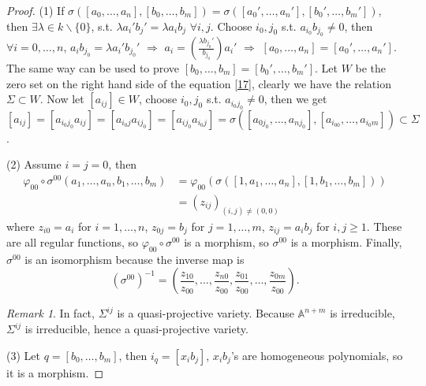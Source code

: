 \documentclass{amsart}
\theoremstyle{plain}
\theoremstyle{definition}
\theoremstyle{remark}
\newtheorem*{remark}{Remark}
\numberwithin{equation}{section}
\begin{document}
\begin{proof}
	(1) If $ \sigma( [a_0,\dots,a_n],[b_0,\dots,b_m] )=\sigma( [ {a_0}',\dots,{a_n}' ],[ {b_0}',\dots,{b_m}' ] ) $, then $ \exists \lambda\in k\backslash \{ 0 \} $, s.t. $ \lambda a_i'b_j'=\lambda a_ib_j $ $ \forall i,j $. Choose $ i_0,j_0 $ s.t. $ a_{i_0}b_{j_0}\neq 0 $, then $ \forall i=0,\dots,n $, $ a_ib_{j_0}=\lambda a_i'b_{j_0}' $ $ \Rightarrow $ $ a_i=\left(\frac{\lambda b_{j_0}'}{b_{j_0}}\right)a_i' $ $ \Rightarrow $ $ [a_0,\dots,a_n]=[{a_0}',\dots,{a_n}'] $. The same way can be used to prove $ [b_0,\dots,b_m]=[{b_0}',\dots,{b_m}'] $. Let $ W $ be the zero set on the right hand side of the equation \ref{17}, clearly we have the relation $ \Sigma\subset W $. Now let $ [a_{ij}]\in W $, choose $ i_0,j_0 $ s.t. $ a_{i_0j_0}\neq 0 $, then we get $ [a_{ij}]=[a_{i_0j_0}a_{ij}]=[a_{i_0j}a_{ij_0}]=[a_{ij_0}a_{i_0j}]=\sigma([a_{0j_0},\dots,a_{nj_0}],[a_{i_00},\dots,a_{i_0m}])\subset \Sigma $.
	
	(2) Assume $ i=j=0 $, then
	$$\begin{array}{cc}
	\varphi_{00}\circ\sigma^{00}(a_1,\dots,a_n,b_1,\dots,b_m) & =\varphi_{00}(\sigma([1,a_1,\dots,a_n],[1,b_1,\dots,b_m]))\\
	& =(z_{ij})_{(i,j)\neq(0,0)}
	\end{array}$$
	where $ z_{i0}=a_i $ for $ i=1,\dots,n $, $ z_{0j}=b_j $ for $ j=1,\dots,m $, $ z_{ij}=a_ib_j $ for $ i,j\geq 1 $. These are all regular functions, so  $ \varphi_{00}\circ \sigma^{00} $ is a morphism, so $ \sigma^{00} $ is a morphism. Finally, $ \sigma^{00} $ is an isomorphism because the inverse map is
	$$
	(\sigma^{00})^{-1}=\left(\frac{z_{10}}{z_{00}},\dots,\frac{z_{n0}}{z_{00}},\frac{z_{01}}{z_{00}},\dots,\frac{z_{0m}}{z_{00}}\right).
	$$
	\begin{remark}
		In fact,  $ \Sigma^{ij} $ is a quasi-projective  variety. Because $ \mathbb{A}^{n+m} $ is irreducible, $ \Sigma^{ij} $ is irreducible, hence a quasi-projective variety.
	\end{remark}
	
	(3) Let $ q=[b_0,\dots,b_m] $, then $ i_{q}=[x_ib_j] $, $ x_ib_j $'s are homogeneous polynomials, so  it is a morphism.
	

\end{proof}
\end{document}
